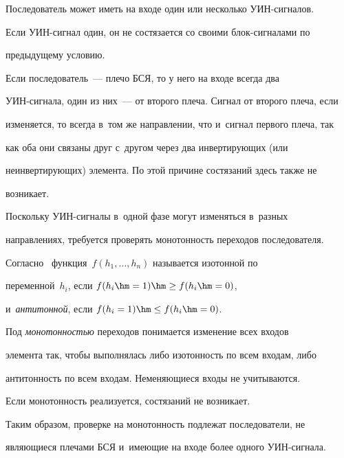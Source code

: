        


   Последователь может иметь на входе один или несколько УИН-сигналов. 


Если УИН-сигнал один, он не состязается со своими блок-сигналами по 


предыду\-ще\-му условию.


   


   Если последователь~--- плечо БСЯ, то у него на входе всегда два  


УИН-сиг\-на\-ла, один из них~--- от второго плеча. Сигнал от второго плеча, если 


изменяется, то всегда в~том же направлении, что и~сигнал первого плеча, так 


как оба они связаны друг с~другом через два инвертирующих (или 


неинвертирующих) элемента. По этой причине состязаний здесь также не 


возникает.


   


   Поскольку УИН-сигналы в~одной фазе могут изменяться в~разных 


на\-прав\-ле\-ниях, требуется проверять монотонность переходов последователя.


   


   Согласно~\cite{1-pl} функция~$f (h_1, \ldots, h_n)$ называется изотонной по 


переменной~$h_i$, если $f (h_i \hm= 1) \hm\geq f (h_i \hm= 0)$, 


и~\textit{антитонной}, если $f (h_i = 1) \hm\leq f (h_i \hm= 0)$.


   


   Под \textit{монотонностью} переходов понимается изменение всех входов 


элемента так, чтобы выполнялась либо изотонность по всем входам, либо 


антитонность по всем входам. Неменяющиеся входы не учитываются.


   


   Если монотонность реализуется, состязаний не возникает.


   


   Таким образом, проверке на монотонность подлежат последователи, не 


являющиеся плечами БСЯ и~имеющие на входе более одного УИН-сигнала. 


